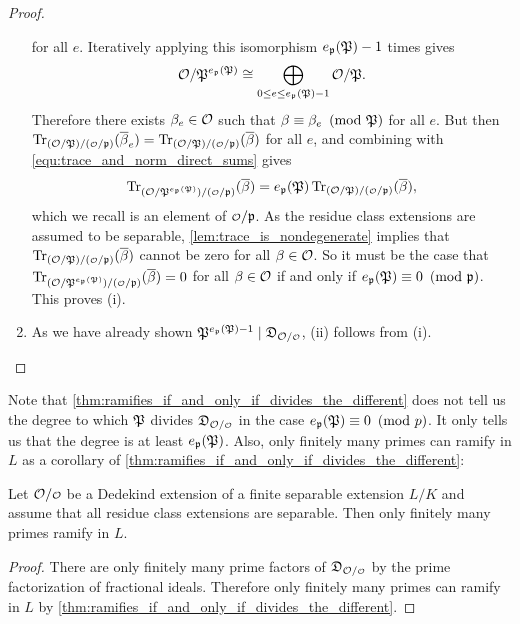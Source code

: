 \begin{proof}
\begin{enumerate}[label=(\roman*)]
        for all $e$. Iteratively applying this isomorphism $e_{\mathfrak{p}}(\mathfrak{P})-1$ times gives
        \[
          \mathcal{O}/\mathfrak{P}^{e_{\mathfrak{p}}(\mathfrak{P})} \cong \bigoplus_{0 \le e \le e_{\mathfrak{p}}(\mathfrak{P})-1}\mathcal{O}/\mathfrak{P}.
        \]
        Therefore there exists $\beta_{e} \in \mathcal{O}$ such that $\beta \equiv \beta_{e} \ \left(\text{mod }\mathfrak{P}\right)$ for all $e$. But then $\Trace_{(\mc{O}/\mf{P})/(\smc{O}/\mf{p})}(\conj{\b}_{e}) = \Trace_{(\mc{O}/\mf{P})/(\smc{O}/\mf{p})}(\conj{\b})$ for all $e$, and combining with \cref{equ:trace_and_norm_direct_sums} gives
        \[
          \Trace_{(\mc{O}/\mf{P}^{e_{\mf{p}}(\mf{P})})/(\smc{O}/\mf{p})}(\conj{\b}) = e_{\mf{p}}(\mf{P})\Trace_{(\mc{O}/\mf{P})/(\smc{O}/\mf{p})}(\conj{\b}),
        \]
        which we recall is an element of $\smc{O}/\mf{p}$. As the residue class extensions are assumed to be separable, \cref{lem:trace_is_nondegenerate} implies that $\Trace_{(\mc{O}/\mf{P})/(\smc{O}/\mf{p})}(\conj{\b})$ cannot be zero for all $\beta \in \mathcal{O}$. So it must be the case that $\Trace_{(\mc{O}/\mf{P}^{e_{\mf{p}}(\mf{P})})/(\smc{O}/\mf{p})}(\conj{\b}) = 0$ for all $\beta \in \mathcal{O}$ if and only if $e_{\mathfrak{p}}(\mathfrak{P}) \equiv 0 \ \left(\text{mod }\mathfrak{p}\right)$. This proves (i).
        \item As we have already shown $\mf{P}^{e_{\mf{p}}(\mf{P})-1} \mid \mf{D}_{\mc{O}/\smc{O}}$, (ii) follows from (i).
      \end{enumerate}
    \end{proof}

    Note that \cref{thm:ramifies_if_and_only_if_divides_the_different} does not tell us the degree to which $\mathfrak{P}$ divides $\mf{D}_{\mc{O}/\smc{O}}$ in the case $e_{\mathfrak{p}}(\mathfrak{P}) \equiv 0 \ \left(\text{mod }p\right)$. It only tells us that the degree is at least $e_{\mathfrak{p}}(\mathfrak{P})$. Also, only finitely many primes can ramify in $L$ as a corollary of \cref{thm:ramifies_if_and_only_if_divides_the_different}:

    \begin{corollary}\label{cor:finitely_many_primes_ramify_L}
      Let $\mc{O}/\smc{O}$ be a Dedekind extension of a finite separable extension $L/K$ and assume that all residue class extensions are separable. Then only finitely many primes ramify in $L$.
    \end{corollary}
    \begin{proof}
      There are only finitely many prime factors of $\mf{D}_{\mc{O}/\smc{O}}$ by the prime factorization of fractional ideals. Therefore only finitely many primes can ramify in $L$ by \cref{thm:ramifies_if_and_only_if_divides_the_different}.
    \end{proof}

